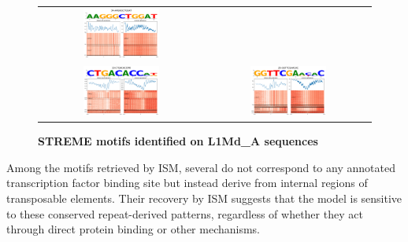 \documentclass[11pt]{book}
\begin{document}
\begin{figure}[htbp]
\begin{tabular}{cc}
        \includegraphics[width=0.48\textwidth]{Figures/Results/xstreme_onrep_meta_hm/34-AAGGGCTGGAT.pdf} \\
         \includegraphics[width=0.48\textwidth]{Figures/Results/xstreme_onrep_meta_hm/10-CTGACACCMK.pdf} &
        \includegraphics[width=0.48\textwidth]{Figures/Results/xstreme_onrep_meta_hm/26-GGTTCGAACAC.pdf} \\
    \end{tabular}
    \caption{\textbf{STREME motifs identified on L1Md\_A sequences}}
    \label{fig:streme_motifs_online}
\end{figure}


Among the motifs retrieved by ISM, several do not correspond to any annotated transcription factor binding site but instead derive from internal regions of transposable elements. Their recovery by ISM suggests that the model is sensitive to these conserved repeat-derived patterns, regardless of whether they act through direct protein binding or other mechanisms.
\end{document}

